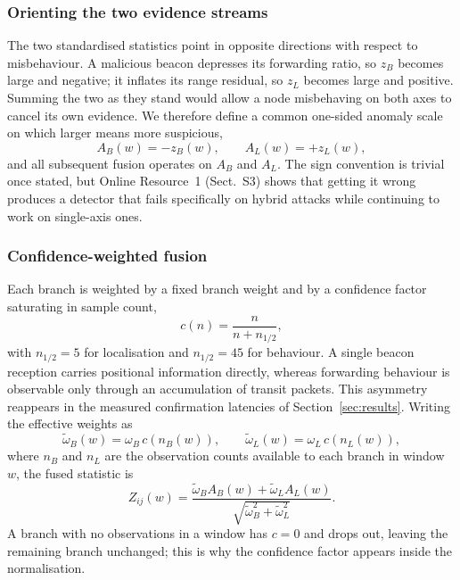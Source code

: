 \subsubsection{Orienting the two evidence streams}

The two standardised statistics point in opposite directions with respect to
misbehaviour. A malicious beacon depresses its forwarding ratio, so $z_B$
becomes large and negative; it inflates its range residual, so $z_L$ becomes
large and positive. Summing the two as they stand would allow a node
misbehaving on both axes to cancel its own evidence. We therefore define a
common one-sided anomaly scale on which larger means more suspicious,
\begin{equation}
\label{eq:orient}
A_B(w) = -z_B(w), \qquad A_L(w) = +z_L(w),
\end{equation}
and all subsequent fusion operates on $A_B$ and $A_L$. The sign convention is
trivial once stated, but Online Resource~1 (Sect.~S3) shows that getting it
wrong produces a detector that fails specifically on hybrid attacks while
continuing to work on single-axis ones.

\subsubsection{Confidence-weighted fusion}

Each branch is weighted by a fixed branch weight and by a confidence factor
saturating in sample count,
\begin{equation}
\label{eq:conf}
c(n) = \frac{n}{n + n_{1/2}},
\end{equation}
with $n_{1/2} = 5$ for localisation and $n_{1/2} = 45$ for behaviour. A single
beacon reception carries positional information directly, whereas forwarding
behaviour is observable only through an accumulation of transit packets. This
asymmetry reappears in the measured confirmation latencies of
Section~\ref{sec:results}. Writing the effective weights as
\begin{equation}
\label{eq:effw}
\tilde\omega_B(w) = \omega_B\, c(n_B(w)), \qquad
\tilde\omega_L(w) = \omega_L\, c(n_L(w)),
\end{equation}
where $n_B$ and $n_L$ are the observation counts available to each branch in
window $w$, the fused statistic is
\begin{equation}
\label{eq:stouffer}
Z_{ij}(w) = \frac{\tilde\omega_B A_B(w) + \tilde\omega_L A_L(w)}
                 {\sqrt{\tilde\omega_B^2 + \tilde\omega_L^2}}.
\end{equation}
A branch with no observations in a window has $c = 0$ and drops out, leaving
the remaining branch unchanged; this is why the confidence factor appears
inside the normalisation.

